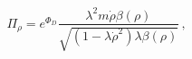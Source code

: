 \begin{equation}
\label{momenta} \Pi_\rho= e^{\Phi_D} \frac{\lambda^2 m\dot{\rho}
\beta(\rho)} { \sqrt{(1- \lambda \dot{\rho}^2)\lambda
\beta(\rho)}}\,,
\end{equation}

